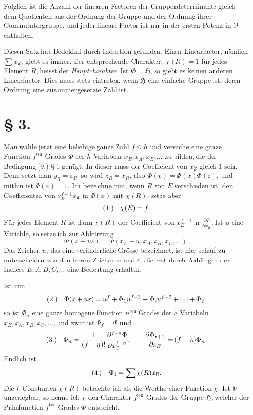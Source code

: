 \documentclass[11pt]{article}
\makeatletter
\newcommand{\Hgrp}{\mathfrak{H}}
\newcommand{\Ggrp}{\mathfrak{G}}
\newcommand{\frobtagc}[2]{\[\begin{array}{@{}r@{\quad}c@{}}\textup{(#1)} & \displaystyle #2\end{array}\]}
\makeatother
\begin{document}
Folglich ist die Anzahl der linearen Factoren der Gruppendeterminante gleich dem Quotienten aus der Ordnung der Gruppe und der Ordnung ihrer Commutatorgruppe, und jeder lineare Factor ist nur in der ersten Potenz in $\Theta$ enthalten.

Diesen Satz hat Dedekind durch Induction gefunden. Einen Linearfactor, nämlich $\sum x_R$, giebt es immer. Der entsprechende Charakter, $\chi(R)=1$ für jedes Element $R$, heisst der \emph{Hauptcharakter}. Ist $\Ggrp=\Hgrp$, so giebt es keinen anderen Linearfactor. Dies muss stets eintreten, wenn $\Hgrp$ eine einfache Gruppe ist, deren Ordnung eine zusammengesetzte Zahl ist.

\section*{§ 3.}

Man wähle jetzt eine beliebige ganze Zahl $f\le h$ und versuche eine ganze Function $f^{\mathrm{ten}}$ Grades $\Phi$ der $h$ Variabeln $x_E,x_A,x_B,\ldots$ zu bilden, die der Bedingung (9.) § 1 genügt. In dieser muss der Coefficient von $x_E^f$ gleich 1 sein. Denn setzt man $y_R=\varepsilon_R$, so wird $z_R=x_R$, also $\Phi(x)=\Phi(x)\Phi(\varepsilon)$, und mithin ist $\Phi(\varepsilon)=1$. Ich bezeichne nun, wenn $R$ von $E$ verschieden ist, den Coefficienten von $x_E^{f-1}x_R$ in $\Phi(x)$ mit $\chi(R)$, setze aber
\frobtagc{1.}{\chi(E)=f.}
Für jedes Element $R$ ist dann $\chi(R)$ der Coefficient von $x_E^{f-1}$ in $\frac{\partial\Phi}{\partial x_R}$. Ist $u$ eine Variable, so setze ich zur Abkürzung
\[
\Phi(x+u\varepsilon)=\Phi(x_E+u,x_A,x_B,x_C,\ldots).
\]
Das Zeichen $u$, das eine veränderliche Grösse bezeichnet, ist hier scharf zu unterscheiden von den leeren Zeichen $x$ und $\varepsilon$, die erst durch Anhängen der Indices $E,A,B,C,\ldots$ eine Bedeutung erhalten.

Ist nun
\frobtagc{2.}{\Phi(x+u\varepsilon)=u^f+\Phi_1u^{f-1}+\Phi_2u^{f-2}+\cdots+\Phi_f,}
so ist $\Phi_n$ eine ganze homogene Function $n^{\mathrm{ten}}$ Grades der $h$ Variabeln $x_E,x_A,x_B,x_C,\ldots$, und zwar ist $\Phi_f=\Phi$ und
\frobtagc{3.}{\Phi_n=\frac{1}{(f-n)!}\frac{\partial^{f-n}\Phi}{\partial x_E^{f-n}},\qquad \frac{\partial\Phi_{n+1}}{\partial x_E}=(f-n)\Phi_n.}
Endlich ist
\frobtagc{4.}{\Phi_1=\sum\chi(R)x_R.}
Die $h$ Constanten $\chi(R)$ betrachte ich als die Werthe einer Function $\chi$. Ist $\Phi$ unzerlegbar, so nenne ich $\chi$ den Charakter $f^{\mathrm{ten}}$ Grades der Gruppe $\Hgrp$, welcher der Primfunction $f^{\mathrm{ten}}$ Grades $\Phi$ entspricht.
\end{document}
